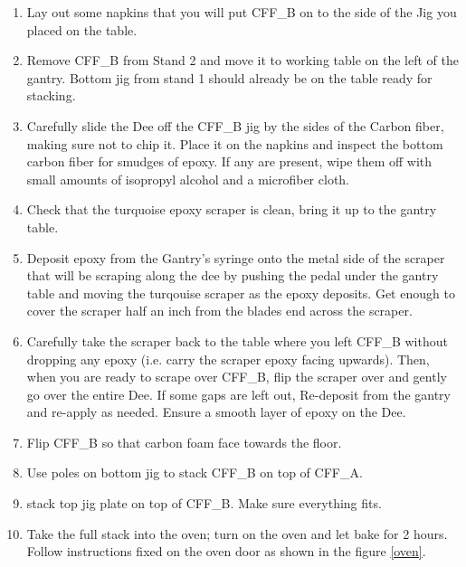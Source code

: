 \documentclass[12pt]{cornelltfpxsop}
\begin{document}
\begin{paracol}{2}
\begin{enumerate}
        \item Lay out some napkins that you will put CFF\_B on to the side of the Jig you placed on the table.
        \item Remove CFF\_B from Stand 2 and move it to working table on the left of the gantry. Bottom jig from stand 1 should already be on the table ready for stacking.
        \item Carefully slide the Dee off the CFF\_B jig by the sides of the Carbon fiber, making sure not to chip it. Place it on the napkins and inspect the bottom carbon fiber for smudges of epoxy. If any are present, wipe them off with small amounts of isopropyl alcohol and a microfiber cloth.
        \item Check that the turquoise epoxy scraper is clean, bring it up to the gantry table.
        \item Deposit epoxy from the Gantry's syringe onto the metal side of the scraper that will be scraping along the dee by pushing the pedal under the gantry table and moving the turqouise scraper as the epoxy deposits. Get enough to cover the scraper half an inch from the blades end across the scraper.
        \item Carefully take the scraper back to the table where you left CFF\_B without dropping any epoxy (i.e. carry the scraper epoxy facing upwards). Then, when you are ready to scrape over CFF\_B, flip the scraper over and gently go over the entire Dee. If some gaps are left out, Re-deposit from the gantry and re-apply as needed. Ensure a smooth layer of epoxy on the Dee.
        \item Flip CFF\_B so that carbon foam face towards the floor.
        \item Use poles on bottom jig to stack CFF\_B on top of CFF\_A.
        \item stack top jig plate on top of CFF\_B. Make sure everything fits.
        \item Take the full stack into the oven; turn on the oven and let bake for 2 hours. Follow instructions fixed on the oven door as shown in the figure \ref{oven}. 
        \begin{figure}
            \centering

\end{figure}
\end{enumerate}
\end{paracol}
\end{document}
